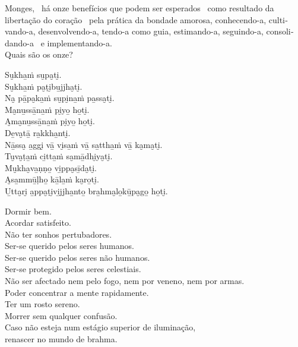 \begin{english}
  Monges, \pause\ há onze benefícios que podem ser esperados \pause\ como resultado da libertação do coração \pause\ pela prática da bondade amorosa, conhecendo-a, cultivando-a, desenvolvendo-a, tendo-a como guia, estimando-a, seguindo-a, consolidando-a \pause\ e implementando-a.\\
  Quais são os onze?
\end{english}


Su̮kha̱ṁ su̮pa̮ti̮.\\
Su̮kha̱ṁ pa̮ṭi̮bu̱jjha̮ti̮.\\
Na̮ pā̱pa̮ka̱ṁ su̮pi̮na̱ṁ pa̱ssa̮ti̮.\\
Ma̮nu̱ssā̱na̱ṁ pi̮yo̱ ho̱ti̮.\\
A̮ma̮nu̱ssā̱na̱ṁ pi̮yo̱ ho̱ti̮.\\
De̱va̮tā̱ ra̱kkha̱nti̮.\\
Nā̱ssa̮ a̱ggi̮ vā̱ vi̮sa̱ṁ vā̱ sa̱ttha̱ṁ vā̱ ka̮ma̮ti̮.\\
Tu̮va̮ṭa̱ṁ ci̱tta̱ṁ sa̮mā̱dhi̮ya̮ti̮.\\
Mu̮kha̮va̱ṇṇo̱ vi̱ppa̮sī̱da̮ti̮.\\
A̮sa̱mmū̱ḷho̱ kā̱la̱ṁ ka̮ro̱ti̮.\\
U̱tta̮ri̮ a̱ppa̮ṭi̮vi̱jjha̱nto̱ bra̱hma̮lo̱kū̱pa̮go̱ ho̱ti̮.

\clearpage

\begin{english}
  Dormir bem.\\
  Acordar satisfeito.\\
  Não ter sonhos pertubadores.\\
  Ser-se querido pelos seres humanos.\\
  Ser-se querido pelos seres não humanos.\\
  Ser-se protegido pelos seres celestiais.\\
  Não ser afectado nem pelo fogo, nem por veneno, nem por armas.\\
  Poder concentrar a mente rapidamente.\\
  Ter um rosto sereno.\\
  Morrer sem qualquer confusão.\\
  Caso não esteja num estágio superior de iluminação,\\
  renascer no mundo de brahma.
\end{english}

